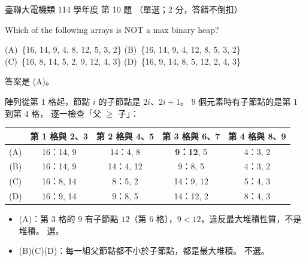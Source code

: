 \begin{pastexam}[label={px:ust-114-ee-ds-10}]{臺聯大電機類 114 學年度 第 10 題}
（單選；2 分，答錯不倒扣）

Which of the following arrays is NOT a max binary heap?

(A)~\{16, 14, 9, 4, 8, 12, 5, 3, 2\} \qquad (B)~\{16, 14, 9, 4, 12, 8, 5, 3, 2\}\\
(C)~\{16, 8, 14, 5, 2, 9, 12, 4, 3\} \qquad (D)~\{16, 9, 14, 8, 5, 12, 2, 4, 3\}
\end{pastexam}

\begin{pastsoln}
答案是 (A)。

陣列從第 $1$ 格起，節點 $i$ 的子節點是 $2i$、$2i+1$。 $9$ 個元素時有子節點的是第 $1$ 到第 $4$ 格，
逐一檢查「父 $\ge$ 子」：
\begin{center}
\small
\begin{tabular}{ccccc}
\toprule
 & 第 1 格與 2、3 & 第 2 格與 4、5 & 第 3 格與 6、7 & 第 4 格與 8、9 \\
\midrule
(A) & 16：14, 9 & 14：4, 8 & \textbf{9：12}, 5 & 4：3, 2 \\
(B) & 16：14, 9 & 14：4, 12 & 9：8, 5 & 4：3, 2 \\
(C) & 16：8, 14 & 8：5, 2 & 14：9, 12 & 5：4, 3 \\
(D) & 16：9, 14 & 9：8, 5 & 14：12, 2 & 8：4, 3 \\
\bottomrule
\end{tabular}
\end{center}
\begin{itemize}
\item (A)：第 3 格的 $9$ 有子節點 $12$（第 6 格），$9 < 12$，違反最大堆積性質，不是堆積。 選。
\item (B)(C)(D)：每一組父節點都不小於子節點，都是最大堆積。 不選。
\end{itemize}
\end{pastsoln}
